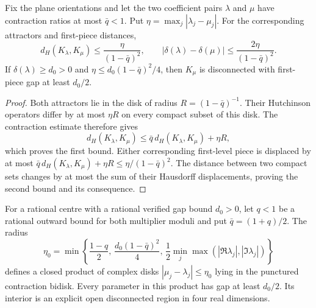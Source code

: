 \begin{lemma}
\label{lem:contact-gap-persistence}
Fix the plane orientations and let the two coefficient pairs $\lambda$ and
$\mu$ have contraction ratios at most $\bar q<1$. Put
$\eta=\max_j|\lambda_j-\mu_j|$. For the corresponding attractors and
first-piece distances,
\[
 d_H(K_\lambda,K_\mu)\leq\frac{\eta}{(1-\bar q)^2},\qquad
 |\delta(\lambda)-\delta(\mu)|\leq\frac{2\eta}{(1-\bar q)^2}.
\]
If $\delta(\lambda)\ge d_0>0$ and
$\eta\le d_0(1-\bar q)^2/4$, then $K_\mu$ is disconnected with first-piece
gap at least $d_0/2$.
\end{lemma}
\begin{proof}
Both attractors lie in the disk of radius $R=(1-\bar q)^{-1}$. Their
Hutchinson operators differ by at most $\eta R$ on every compact subset of
this disk. The contraction estimate therefore gives
\[
 d_H(K_\lambda,K_\mu)
 \leq\bar q\,d_H(K_\lambda,K_\mu)+\eta R,
\]
which proves the first bound. Either corresponding first-level piece is
displaced by at most
$\bar q\,d_H(K_\lambda,K_\mu)+\eta R\le\eta/(1-\bar q)^2$.
The distance between two compact sets changes by at most the sum of their
Hausdorff displacements, proving the second bound and its consequence.
\end{proof}

For a rational centre with a rational verified gap bound $d_0>0$, let $q<1$ be a rational outward
bound for both multiplier moduli and put $\bar q=(1+q)/2$. The radius
\begin{equation}\label{eq:rational-neighbourhood-radius}
 \eta_0=\min\left\{\frac{1-q}{2},\,
           \frac{d_0(1-\bar q)^2}{4},\,
           \frac12\min_j\max(|\Re\lambda_j|,|\Im\lambda_j|)\right\}
\end{equation}
defines a closed product of complex disks
$|\mu_j-\lambda_j|\le\eta_0$ lying in the punctured contraction bidisk.
Every parameter in this product has gap at least $d_0/2$. Its interior is
an explicit open disconnected region in four real dimensions.
